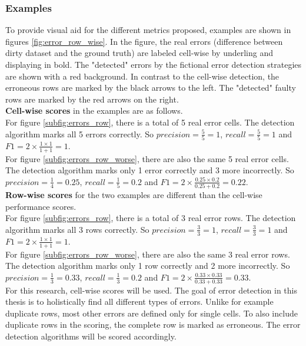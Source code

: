 \subsubsection{Examples}
To provide visual aid for the different metrics proposed, examples are shown in figures \ref{fig:error_row_wise}. In the figure, the real errors (difference between dirty dataset and the ground truth) are labeled cell-wise by underling and displaying in bold. The "detected" errors by the fictional error detection strategies are shown with a red background. In contrast to the cell-wise detection, the erroneous rows are marked by the black arrows to the left. The "detected" faulty rows are marked by the red arrows on the right.
\\\textbf{Cell-wise scores} in the examples are as follows. 
\\For figure \ref{subfig:errors_row}, there is a total of 5 real error cells. The detection algorithm marks all 5 errors correctly. So $precision = \frac{5}{5} = 1$, $recall = \frac{5}{5} = 1$ and $F1 = 2 \times \frac{1 \times 1}{1 + 1} = 1$. 
\\For figure \ref{subfig:errors_row_worse}, there are also the same 5 real error cells. The detection algorithm marks only 1 error correctly and 3 more incorrectly. So $precision = \frac{1}{4} = 0.25$, $recall = \frac{1}{5} = 0.2$ and $F1 = 2 \times \frac{0.25 \times 0.2}{0.25 + 0.2} = 0.22$. 
\\\textbf{Row-wise scores} for the two examples are different than the cell-wise performance scores.
\\For figure \ref{subfig:errors_row}, there is a total of 3 real error rows. The detection algorithm marks all 3 rows correctly. So $precision = \frac{3}{3} = 1$, $recall = \frac{3}{3} = 1$ and $F1 = 2 \times \frac{1 \times 1}{1 + 1} = 1$. 
\\For figure \ref{subfig:errors_row_worse}, there are also the same 3 real error rows. The detection algorithm marks only 1 row correctly and 2 more incorrectly. So $precision = \frac{1}{3} = 0.33$, $recall = \frac{1}{3} = 0.2$ and $F1 = 2 \times \frac{0.33 \times 0.33}{0.33 + 0.33} = 0.33$. 
\\For this research, cell-wise scores will be used. The goal of error detection in this thesis is to holistically find all different types of errors. Unlike for example duplicate rows, most other errors are defined only for single cells. To also include duplicate rows in the scoring, the complete row is marked as erroneous. The error detection algorithms will be scored accordingly.

